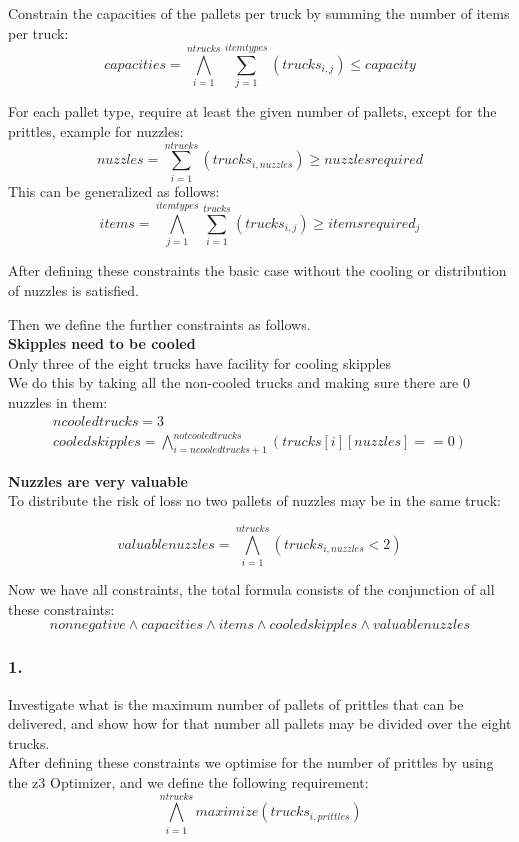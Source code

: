 \documentclass[12pt]{article}
\begin{document}
Constrain the capacities of the pallets per truck by summing the number of items per truck: \\
\[ capacities = \bigwedge_{i=1}^{ntrucks} \sum_{j=1}^{itemtypes} ( trucks_{i,j} ) \leq capacity \]

For each pallet type, require at least the given number of pallets, except for the prittles, example for nuzzles:
\[ nuzzles = \sum_{i=1}^{ntrucks} \left( trucks_{i,nuzzles} \right)  \geq nuzzlesrequired \]
This can be generalized as follows:
\[ items = \bigwedge_{j=1}^{itemtypes} \sum_{i=1}^{trucks} ( trucks_{i,j} ) \geq itemsrequired_j  \]

After defining these constraints the basic case without the cooling or distribution of nuzzles is satisfied.

Then we define the further constraints as follows. \\

\textbf{Skipples need to be cooled} \\
Only three of the eight trucks have facility for cooling skipples\\
We do this by taking all the non-cooled trucks and making sure there are 0 nuzzles in them:
\begin{align}
ncooledtrucks = 3 \\
cooledskipples = \bigwedge_{i=ncooledtrucks + 1}^{notcooledtrucks} (trucks[i][nuzzles] == 0)
 \end{align}

\textbf{Nuzzles are very valuable} \\
To distribute the risk of loss no two pallets of nuzzles may be in the same truck:

\[ valuablenuzzles = \bigwedge_{i=1}^{ntrucks} (trucks_{i,nuzzles} < 2) \]

Now we have all constraints, the total formula consists of the conjunction of all these constraints:
\[ nonnegative \wedge capacities \wedge items \wedge cooledskipples \wedge valuablenuzzles  \]

\subsubsection*{1.}

Investigate what is the maximum number of pallets of prittles that can be delivered,
and show how for that number all pallets may be divided over the eight trucks. \\

After defining these constraints we optimise for the number of prittles by using the z3 Optimizer, and we
define the following requirement:
\[ \bigwedge_{i=1}^{ntrucks} maximize(trucks_{i,prittles}) \]
\end{document}
